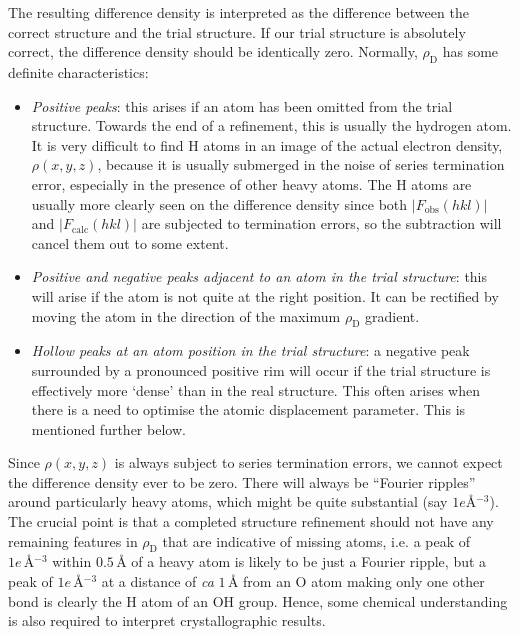 \documentclass{article}
\theoremstyle{plain}\theoremheaderfont{\normalfont\itshape}\theorembodyfont{\rmfamily}\theoremseparator{.}\newtheorem*{rem}{Remark}\newtheorem*{ex}{Example}\newtheorem*{proof}{Proof}\newtheorem*{altp}{Alternative proof}
\theoremstyle{plain}\theoremheaderfont{\normalfont\bfseries}\theorembodyfont{\rmfamily}\theoremseparator{.}\newtheorem{thm}{Theorem}[section]\newtheorem{lem}[thm]{Lemma}\newtheorem{prop}[thm]{Proposition}\newtheorem*{cor}{Corollary}\newtheorem{defn}[thm]{Definition}\newtheorem{clm}[thm]{Claim}\newtheorem{clminproof}{Claim}\newtheorem*{law}{Law}\newtheorem{pos}[thm]{Postulate}
\theoremstyle{break}\theoremheaderfont{\normalfont\itshape}\theorembodyfont{\rmfamily}\theoremseparator{.\medskip}\newtheorem*{proofskip}{Proof}\newtheorem*{exs}{Examples}\newtheorem*{rems}{Remarks}
\theoremstyle{break}\theoremheaderfont{\normalfont\bfseries}\theorembodyfont{\rmfamily}\theoremseparator{.\medskip}\newtheorem{lemskip}[thm]{Lemma}\newtheorem{defnskip}[thm]{Definition}\newtheorem{propskip}[thm]{Proposition}\newtheorem{thmskip}[thm]{Theorem}
\numberwithin{equation}{section}
\newcommand{\abs}[1]{\left| #1 \right|}
\begin{document}
    The resulting difference density is interpreted as the difference between the correct structure and the trial structure. If our trial structure is absolutely correct, the difference density should be identically zero. Normally, \(\rho_{\text{D}}\) has some definite characteristics:
    \begin{itemize}
        \item \textit{Positive peaks}: this arises if an atom has been omitted from the trial structure. Towards the end of a refinement, this is usually the hydrogen atom. It is very difficult to find H atoms in an image of the actual electron density, \(\rho(x,y,z)\), because it is usually submerged in the noise of series termination error, especially in the presence of other heavy atoms. The H atoms are usually more clearly seen on the difference density since both \(\abs{F_{\text{obs}}(hkl)}\) and \(\abs{F_{\text{calc}}(hkl)}\) are subjected to termination errors, so the subtraction will cancel them out to some extent.
        \item \textit{Positive and negative peaks adjacent to an atom in the trial structure}: this will arise if the atom is not quite at the right position. It can be rectified by moving the atom in the direction of the maximum \(\rho_{\text{D}}\) gradient.
        \item \textit{Hollow peaks at an atom position in the trial structure}: a negative peak surrounded by a pronounced positive rim will occur if the trial structure is effectively more `dense' than in the real structure. This often arises when there is a need to optimise the atomic displacement parameter. This is mentioned further below.
    \end{itemize}

    Since \(\rho(x,y,z)\) is always subject to series termination errors, we cannot expect the difference density ever to be zero. There will always be ``Fourier ripples'' around particularly heavy atoms, which might be quite substantial (say \(1e\text{\AA}{}^{-3}\)). The crucial point is that a completed structure refinement should not have any remaining features in \(\rho_{\text{D}}\) that are indicative of missing atoms, i.e. a peak of \(1e\,\text{\AA}{}^{-3}\) within \(0.5\,\text{\AA}\) of a heavy atom is likely to be just a Fourier ripple, but a peak of \(1e\,\text{\AA}{}^{-3}\) at a distance of \textit{ca} \(1\,\text{\AA}\) from an O atom making only one other bond is clearly the H atom of an OH group. Hence, some chemical understanding is also required to interpret crystallographic results.
\end{document}
